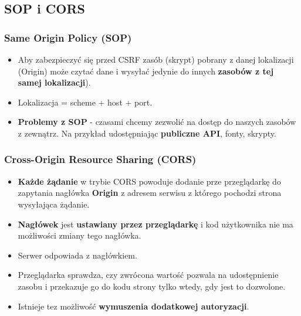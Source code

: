 \documentclass[../main.tex]{subfiles}
\begin{document}
    \subsection{SOP i CORS}

    \subsubsection{Same Origin Policy (SOP)}
    \begin{itemize}
        \item Aby zabezpieczyć się przed CSRF zasób (skrypt) pobrany z danej lokalizacji
        (Origin) może czytać dane i wysyłać jedynie do innych  \textbf{zasobów z tej samej
        lokalizacji}).
        \item Lokalizacja = scheme + host + port.
        \item \textbf{Problemy z SOP} - czasami chcemy zezwolić na dostęp do naszych zasobów z zewnątrz. Na
        przykład udostępniając  \textbf{publiczne API}, fonty, skrypty.
    \end{itemize}

    \subsubsection{Cross-Origin Resource Sharing (CORS)}
    \begin{itemize}
        \item \textbf{Każde żądanie} w trybie CORS powoduje dodanie prze przeglądarkę do
        zapytania nagłówka \textbf{Origin} z adresem serwisu z którego pochodzi strona
        wysyłająca żądanie.
        \item \textbf{Nagłówek} jest \textbf{ustawiany przez przeglądarkę} i kod użytkownika nie ma
        możliwości zmiany tego nagłówka.
        \item Serwer odpowiada z nagłówkiem.
        \item Przeglądarka sprawdza, czy zwrócona wartość pozwala na udostępnienie
        zasobu i przekazuje go do kodu strony tylko wtedy, gdy jest to dozwolone.
        \item Istnieje tez możliwość \textbf{wymuszenia dodatkowej autoryzacji}.
    \end{itemize}
\end{document}
